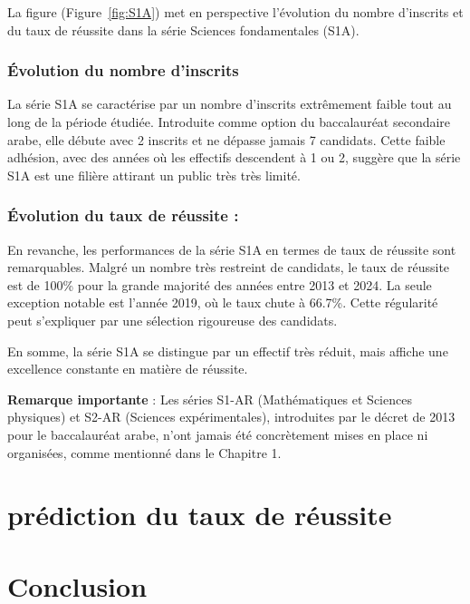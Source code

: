La figure (Figure~\ref{fig:S1A}) met en perspective l'évolution du nombre d'inscrits et du taux de réussite dans la série Sciences fondamentales (S1A).

\subsubsection{Évolution du nombre d'inscrits}

La série S1A se caractérise par un nombre d'inscrits extrêmement faible tout au long de la période étudiée. Introduite comme option du baccalauréat secondaire arabe, elle débute avec 2 inscrits et ne dépasse jamais 7 candidats. 
Cette faible adhésion, avec des années où les effectifs descendent à 1 ou 2, suggère que la série S1A est une filière attirant un public très très limité.

\subsubsection{Évolution du taux de réussite :}

En revanche, les performances de la série S1A en termes de taux de réussite sont remarquables. 
Malgré un nombre très restreint de candidats, le taux de réussite est de 100\% pour la grande majorité des années entre 2013 et 2024. 
La seule exception notable est l'année 2019, où le taux chute à 66.7\%. 
Cette régularité peut s’expliquer par une sélection rigoureuse des candidats.

\bigskip

En somme, la série S1A se distingue par un effectif très réduit, mais affiche une excellence constante en matière de réussite. 

\textbf{Remarque importante} : Les séries S1-AR (Mathématiques et Sciences physiques) et S2-AR (Sciences expérimentales), introduites par le décret de 2013 pour le baccalauréat arabe, n'ont jamais été concrètement mises en place ni organisées, comme mentionné dans le Chapitre 1.

\section{prédiction du taux de réussite}

\section{Conclusion}